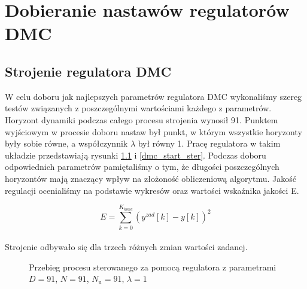 \chapter{Dobieranie nastawów regulatorów DMC}
\label{dmc}

\section{Strojenie regulatora DMC}
\label{dmc_strojenie}

W celu doboru jak najlepszych parametrów regulatora DMC wykonaliśmy szereg testów związanych z poszczególnymi wartościami każdego z parametrów. Horyzont dynamiki podczas całego procesu strojenia wynosił 91. Punktem wyjściowym w procesie doboru nastaw był punkt, w którym wszystkie horyzonty były sobie równe, a współczynnik $\lambda$ był równy 1. Pracę regulatora w takim układzie przedstawiają rysunki \ref{dmc_start} i \ref{dmc_start_ster}. Podczas doboru odpowiednich parametrów pamiętaliśmy o tym, że długości poszczególnych horyzontów mają znaczący wpływ na złożoność obliczeniową algorytmu. Jakość regulacji ocenialiśmy na podstawie wykresów oraz wartości wskaźnika jakości E.

\begin{equation}
E=\sum_{k=0}^{K_{konc}}(y^{zad}[k]-y[k])^{2}
\end{equation}
\\

Strojenie odbywało się dla trzech różnych zmian wartości zadanej.
\\

\begin{figure}[t]
    \centering
    \caption{Przebieg procesu sterowanego za pomocą regulatora z parametrami $D = 91$, $N = 91$, $N_{\mathrm{u}} = 91$, $\lambda = 1$}
    \label{dmc_start}
\end{figure}

